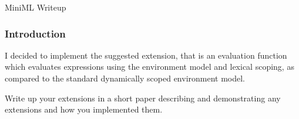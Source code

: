 \documentclass[submit]{harvardml}
\begin{document}
\begin{center}
{\Large MiniML Writeup}\\
\end{center}

\subsubsection*{Introduction}
I decided to implement the suggested extension, that is an evaluation function which evaluates expressions using the environment model and lexical scoping, as compared to the standard dynamically scoped environment model.


Write up your extensions in a short paper describing and demonstrating any extensions and how you implemented them.
\end{document}
